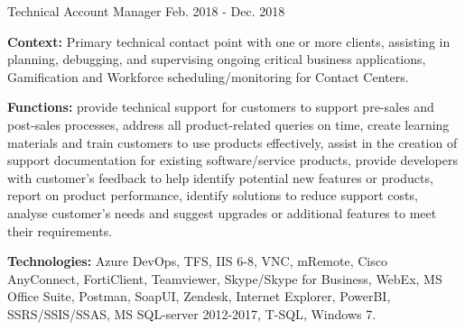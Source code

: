 \begin{cventries}
  \cventry
    {Technical Account Manager} %
    {} %
    {} %
    {Feb. 2018 - Dec. 2018} %
    {
      \begin{cvitems} %
		\item[] {\textbf{Context:} Primary technical contact point with one or more clients, assisting in planning, debugging, and supervising ongoing critical business applications, Gamification and Workforce scheduling/monitoring for Contact Centers.}
		\item[] {\textbf{Functions:} provide technical support for customers to support pre-sales and post-sales processes, address all product-related queries on time, create learning materials and train customers to use products effectively, assist in the creation of support documentation for existing software/service products, provide developers with customer's feedback to help identify potential new features or products, report on product performance, identify solutions to reduce support costs, analyse customer's needs and suggest upgrades or additional features to meet their requirements.}		
		\item[] {\textbf{Technologies:} \textcolor{rainbowcolor-olive}{Azure DevOps}, \textcolor{rainbowcolor-olive}{TFS}, \textcolor{rainbowcolor-olive}{IIS 6-8}, \textcolor{rainbowcolor-olive}{VNC}, \textcolor{rainbowcolor-olive}{mRemote}, \textcolor{rainbowcolor-olive}{Cisco AnyConnect}, %
\textcolor{rainbowcolor-olive}{FortiClient}, \textcolor{rainbowcolor-olive}{Teamviewer}, \textcolor{rainbowcolor-olive}{Skype/Skype for Business}, \textcolor{rainbowcolor-olive}{WebEx}, \textcolor{rainbowcolor-olive}{MS Office Suite}, \textcolor{rainbowcolor-olive}{Postman}, \textcolor{rainbowcolor-olive}{SoapUI}, \textcolor{rainbowcolor-olive}{Zendesk}, \textcolor{rainbowcolor-olive}{Internet Explorer}, \textcolor{rainbowcolor-olive}{PowerBI}, \textcolor{rainbowcolor-olive}{SSRS/SSIS/SSAS}, \textcolor{rainbowcolor-olive}{MS SQL-server 2012-2017},  \textcolor{rainbowcolor-indigo}{T-SQL}, \textcolor{rainbowcolor-orange}{Windows 7}.}		
      \end{cvitems}
    } 
    

\end{cventries}
